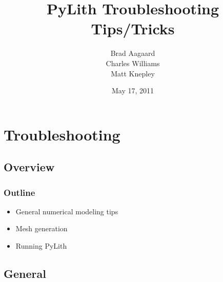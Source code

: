 \documentclass{beamer}
\title{PyLith Troubleshooting Tips/Tricks}
\subtitle{}
\author{Brad Aagaard \\
  Charles Williams \\
  Matt Knepley}
\institute{}
\date{May 17, 2011}
\begin{document}
\maketitle


\section{Troubleshooting}
\subsection{Overview}

\begin{frame}
  \frametitle{Outline}
  \summary{}

  \begin{itemize}
  \item General numerical modeling tips
  \item Mesh generation
  \item Running PyLith
  \end{itemize}
  
\end{frame}

\subsection{General}
\end{document}
